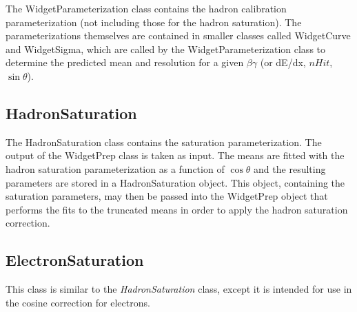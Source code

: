 \documentclass{article}
\begin{document}
The WidgetParameterization class contains the hadron calibration parameterization (not including
those for the hadron saturation). The parameterizations themselves are contained in smaller classes
called WidgetCurve and WidgetSigma, which are called by the WidgetParameterization class to 
determine the predicted mean and resolution for a given $\beta\gamma$ (or dE/dx, $nHit$, 
$\sin{\theta}$).

\subsection{HadronSaturation}

The HadronSaturation class contains the saturation parameterization. The output of the WidgetPrep
class is taken as input. The means are fitted with the hadron saturation parameterization as a 
function of $\cos{\theta}$ and the resulting parameters are stored in a HadronSaturation object.
This object, containing the saturation parameters, may then be passed into the WidgetPrep object
that performs the fits to the truncated means in order to apply the hadron saturation correction.

\subsection{ElectronSaturation}

This class is similar to the \textit{HadronSaturation} class, except it is intended for use in
the cosine correction for electrons.
\end{document}
